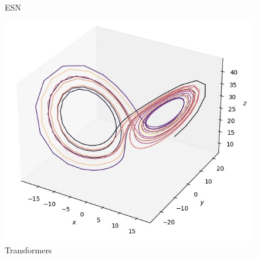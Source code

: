 \documentclass[11pt]{article}
\begin{document}
\begin{figure}[ht]
\begin{minipage}{0.32\textwidth}
        \caption{ESN}
    \end{minipage}\hfill
    \begin{minipage}{0.32\textwidth}
        \centering
        \includegraphics[width=\textwidth]{transformers_lorenz.jpeg}
        \caption{Transformers}
    \end{minipage}
\end{figure}
\end{document}
